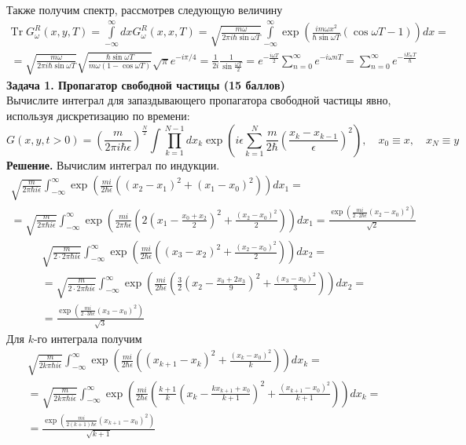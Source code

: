 \documentclass[12pt]{article}
\theoremstyle{definition}
\begin{document}
Также получим спектр, рассмотрев следующую величину
\begin{multline*}
    \text{Tr}\;G_\omega^R(x,y,T)=\int\limits_{-\infty}^\infty dxG_\omega^R(x,x,T)=\sqrt{\frac{m\omega}{2\pi i\hbar\sin\omega T}}\int\limits_{-\infty}^\infty\exp\left(\frac{im\omega x^{2}}{\hbar\sin\omega T}\left(\cos\omega T-1\right)\right)dx=\\=\sqrt{\frac{m\omega}{2\pi i\hbar\sin\omega T}}\sqrt{\frac{\hbar\sin\omega T}{m\omega(1-\cos\omega T)}}\sqrt{\pi}e^{-i\pi/4}=\frac{1}{2i}\frac{1}{\sin\frac{\omega T}{2}}=e^{-\frac{i\omega T}{2}}\sum_{n=0}^{\infty}e^{-i\omega nT}=\sum_{n=0}^{\infty}e^{-\frac{iE_nT}{\hbar}}
\end{multline*}
\textbf{Задача 1. Пропагатор свободной частицы (15 баллов)}\\
Вычислите интеграл для запаздывающего пропагатора свободной частицы явно, используя дискретизацию по времени:
\begin{equation}
    G(x,y,t>0)=\left(\frac{m}{2\pi i\hbar\epsilon}\right)^\frac{N}{2}\int\prod\limits_{k=1}^{N-1}dx_k\exp\left(i\epsilon\sum\limits_{k=1}^N\frac{m}{2\hbar}\left(\frac{x_k-x_{k-1}}{\epsilon}\right)^2\right),\quad x_0\equiv x,\quad x_N\equiv y
\end{equation}
\textbf{Решение.}
Вычислим интеграл по индукции.
\begin{multline*}
    \sqrt{\frac{m}{2\pi\hbar i\epsilon}}\int_{-\infty}^{\infty}\exp\left(\frac{mi}{2\hbar\epsilon}((x_{2}-x_{1})^{2}+(x_{1}-x_{0})^{2})\right)dx_1=\\=\sqrt{\frac{m}{2\pi\hbar i\epsilon}}\int_{-\infty}^{\infty}\exp\left(\frac{mi}{2\pi\hbar\epsilon}\left(2\left(x_{1}-\frac{x_{0}+x_{2}}{2}\right)^{2}+\frac{(x_{2}-x_{0})^{2}}{2}\right)\right)dx_1=\frac{\exp(\frac{mi}{2\cdot2\hbar\epsilon}(x_{2}-x_{0})^{2})}{\sqrt{2}}
\end{multline*}
\begin{multline}
    \sqrt{\frac{m}{2\cdot2\pi\hbar i\epsilon}}\int_{-\infty}^{\infty}\exp\left(\frac{mi}{2\hbar\epsilon}\left((x_3-x_2)^2+\frac{(x_2-x_0)^2}{2}\right)\right)dx_2=\\=\sqrt{\frac{m}{2\cdot2\pi\hbar i\epsilon}}\int_{-\infty}^{\infty}\exp\left(\frac{mi}{2\hbar\epsilon}\left(\frac{3}{2}\left(x_{2}-\frac{x_{0}+2x_{3}}{9}\right)^{2}+\frac{(x_3-x_0)^2}{3}\right)\right)dx_2=\\=\frac{\exp(\frac{mi}{2\cdot3\hbar\epsilon}(x_3-x_{0})^{2})}{\sqrt{3}}
\end{multline}
Для $k$-го интеграла получим
\begin{multline}
    \sqrt{\frac{m}{2k\pi\hbar i\epsilon}}\int_{-\infty}^{\infty}\exp\left(\frac{mi}{2\hbar\epsilon}\left((x_{k+1}-x_k)^2+\frac{(x_k-x_0)^2}{k}\right)\right)dx_k=\\=\sqrt{\frac{m}{2k\pi\hbar i\epsilon}}\int_{-\infty}^{\infty}\exp\left(\frac{mi}{2\hbar\epsilon}\left(\frac{k+1}{k}\left(x_k-\frac{kx_{k+1}+x_0}{k+1}\right)^2+\frac{(x_{k+1}-x_0)^{2}}{k+1}\right)\right)dx_k=\\=\frac{\exp(\frac{mi}{2(k+1)\hbar\epsilon}(x_{k+1}-x_{0})^{2})}{\sqrt{k+1}}
\end{multline}
\end{document}
